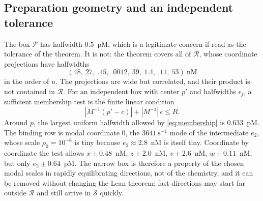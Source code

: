 \documentclass[11pt,a4paper]{article}
\theoremstyle{plain}
\theoremstyle{definition}
\theoremstyle{remark}
\newcommand{\RR}{\mathcal R}
\newcommand{\SSS}{\mathcal S}
\newcommand{\Pp}{\mathcal P}
\begin{document}
\subsection{Preparation geometry and an independent tolerance}
\label{sec:geometry}
The box $\Pp$ has halfwidth $0.5$~pM, which is a legitimate concern if read as
the tolerance of the theorem. It is not: the theorem covers all of $\RR$,
whose coordinate projections have halfwidths
\[
(48,\ 27,\ .15,\ .0012,\ 39,\ 1.4,\ .11,\ 53)\ \text{nM}
\]
in the order of $u$. The projections are wide but correlated, and their
product is not contained in $\RR$. For an independent box with center $p'$ and
halfwidths $\epsilon_j$, a sufficient membership test is the finite linear
condition
\begin{equation}\label{eq:membership}
|M^{-1}(p'-c)|+|M^{-1}|\,\epsilon\le R .
\end{equation}
Around $p$, the largest uniform halfwidth allowed by \eqref{eq:membership} is
$0.633$~pM. The binding row is modal coordinate $0$, the $3641~\mathrm s^{-1}$
mode of the intermediate $e_2$, whose scale $\rho_0=10^{-6}$ is tiny because
$e_2\approx2.8$~nM is itself tiny. Coordinate by coordinate the test allows
$x\pm0.48$~nM, $z\pm2.0$~nM, $v\pm2.6$~nM, $w\pm0.11$~nM, but only
$e_2\pm0.64$~pM. The narrow box is therefore a property of the chosen modal
scales in rapidly equilibrating directions, not of the chemistry, and it can be
removed without changing the Lean theorem: fast directions may start far
outside $\RR$ and still arrive in $\SSS$ quickly.
\end{document}
